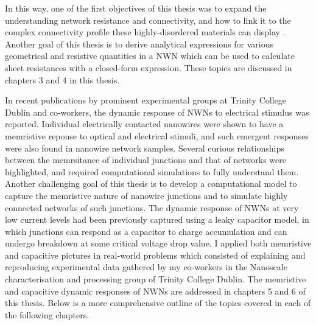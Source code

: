 In this way, one of the first objectives of this thesis was to expand the understanding network resistance and connectivity, and how to link it to the complex connectivity profile these highly-disordered materials can display \cite{rocha2015,fairfield2016}. Another goal of this thesis is to derive analytical expressions for various geometrical and resistive quantities in a NWN which can be used to calculate sheet resistances with a closed-form expression\cite{ocallaco2016}. These topics are discussed in chapters 3 and 4 in this thesis.

In recent publications by prominent experimental groups at Trinity College Dublin and co-workers, the dynamic response of NWNs to electrical stimulus was reported\cite{nirmalraj2012,fairfield2014,bellew2014,rocha2015,fairfield2016,manning2017}. Individual electrically contacted nanowires were shown to have a memristive reponse to optical and electrical stimuli\cite{okelly2016}, and such emergent responses were also found in nanowire network samples\cite{nirmalraj2012,bellew2014,manning2017}. Several curious relationships between the memrsitance of individual junctions and that of networks were highlighted, and required computational simulations to fully understand them. Another challenging goal of this thesis is to develop a computational model to capture the memristive nature of nanowire junctions and to simulate highly connected networks of such junctions\cite{scaling2018}. The dynamic response of NWNs at very low current levels had been previously captured using a leaky capacitor model, in which junctions can respond as a capacitor to charge accumulation and can undergo breakdown at some critical voltage drop value\cite{nirmalraj2012,fairfield2014,fairfield2016}. I applied both memristive and capacitive pictures in real-world problems which consisted of explaining and reproducing experimental data gathered by my co-workers in the Nanoscale characterisation and processing group of Trinity College Dublin\cite{scaling2018}. The memristive and capacitive dynamic responses of NWNs are addressed in chapters 5 and 6 of this thesis. Below is a more comprehensive outline of the topics covered in each of the following chapters.

